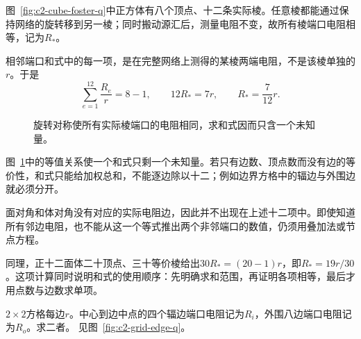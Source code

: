 \begin{solution}
图~\ref{fig:c2-cube-foster-q}中正方体有八个顶点、十二条实际棱。任意棱都能通过保持网络的旋转移到另一棱；同时搬动源汇后，测量电阻不变，故所有棱端口电阻相等，记为$R_*$。

相邻端口和式中的每一项，是在完整网络上测得的某棱两端电阻，不是该棱单独的$r$。于是
\[
 \sum_{e=1}^{12}\frac{R_e}r=8-1,
 \qquad12R_*=7r,
 \qquad\boxed{R_*=\frac7{12}r}.
\]
\begin{figure}[H]\centering
{}
\caption{旋转对称使所有实际棱端口的电阻相同，求和式因而只含一个未知量。}\label{fig:c2-cube-foster-s}
\end{figure}
图~\ref{fig:c2-cube-foster-s}中的等值关系使一个和式只剩一个未知量。若只有边数、顶点数而没有边的等价性，和式只能给加权总和，不能逐边除以十二；例如边界方格中的辐边与外围边就必须分开。

面对角和体对角没有对应的实际电阻边，因此并不出现在上述十二项中。即使知道所有邻边电阻，也不能从这一个等式推出两个非邻端口的数值，仍须用叠加法或节点方程。

同理，正十二面体二十顶点、三十等价棱给出$30R_*=(20-1)r$，即$R_*=19r/30$。这项计算同时说明和式的使用顺序：先明确求和范围，再证明各项相等，最后才用点数与边数求单项。
\end{solution}

\begin{example}[二阶方格的两种相邻边]\label{ex:c2-grid-edge}
$2\times2$方格每边$r$。中心到边中点的四个辐边端口电阻记为$R_i$，外围八边端口电阻记为$R_o$。求二者。 见图~\ref{fig:c2-grid-edge-q}。
\end{example}

